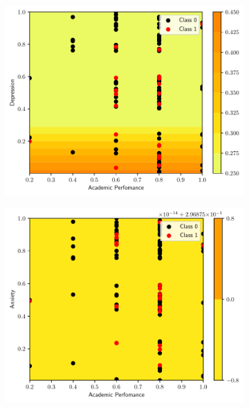 \documentclass[conference]{IEEEtran}
\theoremstyle{definition}
\theoremstyle{remark}
\theoremstyle{remark}
\begin{document}
\begin{figure}
    \begin{subfigure}[b]{0.32\textwidth}
        \centering
        \includegraphics[width=\textwidth]{figs/tree-contour-1-3.pdf}
        \caption{}
    \end{subfigure}
    \begin{subfigure}[b]{0.32\textwidth}
        \centering
        \includegraphics[width=\textwidth]{figs/tree-contour-1-4.pdf}
        \caption{}
    \end{subfigure}
    \begin{subfigure}[b]{0.32\textwidth}
        \centering

\end{subfigure}
\end{figure}
\end{document}
